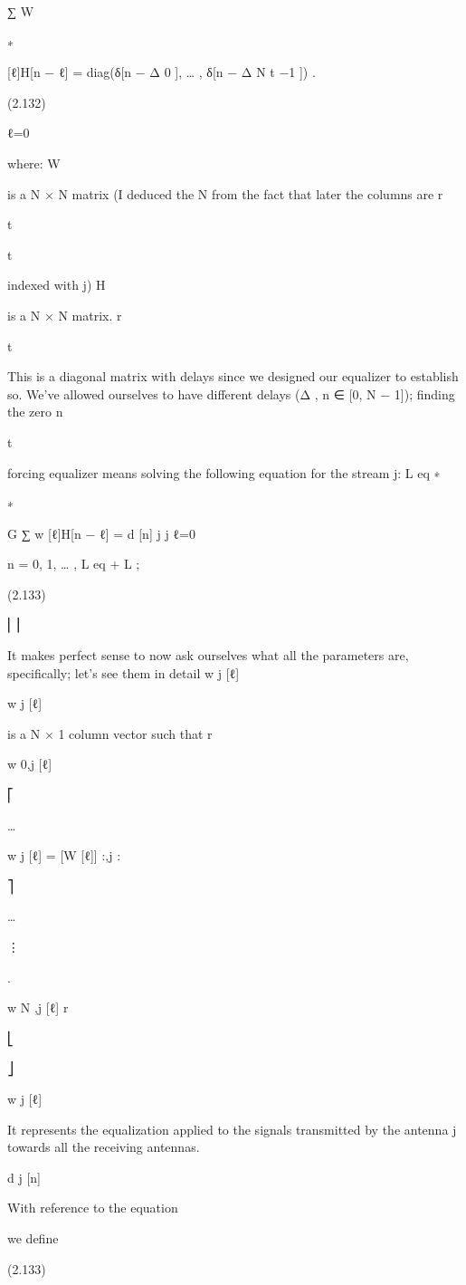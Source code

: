 {\sqrtG ∑ W

∗

[ℓ]H[n − ℓ] = diag(δ[n − Δ 0 ], … , δ[n − Δ N t −1 ]) .

(2.132)

ℓ=0

where:
W

is a N × N matrix (I deduced the N from the fact that later the columns are r

t

t

indexed with j)
H

is a N × N matrix.
r

t

This is a diagonal matrix with delays since we designed our equalizer to establish so.
We've allowed ourselves to have different delays (Δ , n ∈ [0, N − 1]); finding the zero n

t

forcing equalizer means solving the following equation for the stream j:
L eq
∗

∗

\sqrt G ∑ w [ℓ]H[n − ℓ] = d [n]
j j ℓ=0

n = 0, 1, … , L eq + L ;

(2.133)

⎢⎥

It makes perfect sense to now ask ourselves what all the parameters are, specifically;
let's see them in detail w j [ℓ]

w j [ℓ]

is a N × 1 column vector such that r

w 0,j [ℓ]

⎡

…

w j [ℓ] = [W [ℓ]] :,j :

⎤

…

⋮

.

w N ,j [ℓ]
r

⎣

⎦

w j [ℓ]

It represents the equalization applied to the signals transmitted by the antenna j towards all the receiving antennas.

d j [n]

With reference to the equation

we define

(2.133)

}
